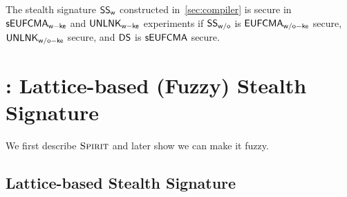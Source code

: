 \begin{theorem}[informal]
\label{thm:compiler}
The stealth signature $\mathsf{SS}_\mathsf{w}$ constructed in~\cref{sec:compiler} is secure in $\mathsf{sEUFCMA}_\mathsf{w-ke}$ and $\mathsf{UNLNK}_\mathsf{w-ke}$ experiments if $\mathsf{SS}_\mathsf{w/o}$ is $\mathsf{EUFCMA}_\mathsf{w/o-ke}$ secure, $\mathsf{UNLNK}_\mathsf{w/o-ke}$ secure, and $\mathsf{DS}$ is $\mathsf{sEUFCMA}$ secure.
\end{theorem}


\section{\name: Lattice-based (Fuzzy) Stealth Signature}
\label{sec:ss-main-constructions}
We first describe $\textsc{Spirit}$ and later show we can make it fuzzy.

\subsection{Lattice-based Stealth Signature}
\label{sec:ss-lattice}

